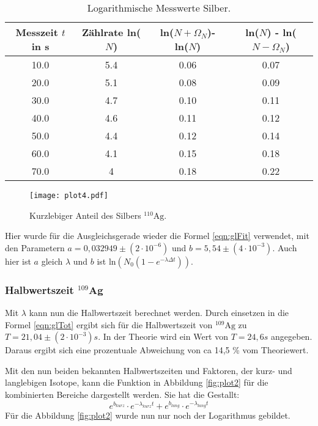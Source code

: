 \begin{table}
  \centering
  \caption{Logarithmische Messwerte Silber.}
  \label{tab:lnN2k}
\begin{tabular}{c c c c}
  \toprule
  Messzeit $t$ in s & Zählrate ln($N$) & ln($N + \Omega_N$)- ln($N$) & ln($N$) - ln($N - \Omega_N$)\\
  \midrule
  10.0 & 5.4 & 0.06 & 0.07 \\
  20.0 & 5.1 & 0.08 & 0.09 \\
  30.0 & 4.7 & 0.10 & 0.11 \\
  40.0 & 4.6 & 0.11 & 0.12 \\
  50.0 & 4.4 & 0.12 & 0.14 \\
  60.0 & 4.1 & 0.15 & 0.18 \\
  70.0 & 4 & 0.18 & 0.22 \\
  \bottomrule
\end{tabular}
\end{table}
\FloatBarrier

\begin{figure}
  \centering
  \texttt{[image: plot4.pdf]}
  \caption{Kurzlebiger Anteil des Silbers $^{110}\text{Ag}$.}
  \label{fig:plot4}
\end{figure}
\FloatBarrier

Hier wurde für die Ausgleichsgerade wieder die Formel \ref{eqn:glFit} verwendet, mit den Parametern $a = 0,032949 \pm (2 \cdot 10^{-6})$ und $b = 5,54 \pm (4 \cdot 10^{-3})$.
Auch hier ist $a$ gleich $\lambda$ und $b$ ist $\text{ln}(N_0(1-e^{-\lambda \Delta t}))$.

\subsubsection{Halbwertszeit $^{109}$Ag}

Mit $\lambda$ kann nun die Halbwertszeit berechnet werden.
Durch einsetzen in die Formel \ref{eqn:glTot} ergibt sich für die Halbwertszeit von $^{109}\text{Ag}$ zu $T = 21,04 \pm (2 \cdot 10^{-3}) s$.
In der Theorie wird ein Wert von $T = 24,6 s$ \cite{Periode} angegeben.
Daraus ergibt sich eine prozentuale Abweichung von ca 14,5 \% vom Theoriewert.

Mit den nun beiden bekannten Halbwertszeiten und Faktoren, der kurz- und langlebigen Isotope, kann die Funktion in Abbildung \ref{fig:plot2} für die kombinierten Bereiche dargestellt werden.
Sie hat die Gestallt:
\begin{equation}
  e^{b_{kurz}} \cdot e^{-\lambda_{kurz} t} + e^{b_{lang}} \cdot e^{-\lambda_{lang} t}
\end{equation}
Für die Abbildung \ref{fig:plot2} wurde nun nur noch der Logarithmus gebildet.